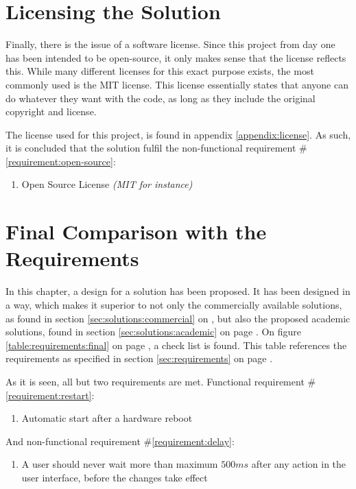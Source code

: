 	\section{Licensing the Solution}
		\label{requirement:fulfilled:open-source}
		Finally, there is the issue of a software license. Since this project from day one has been intended to be open-source, it only makes sense that the license reflects this. While many different licenses for this exact purpose exists, the most commonly used is the MIT license. This license essentially states that anyone can do whatever they want with the code, as long as they include the original copyright and license.

		The license used for this project, is found in appendix \ref{appendix:license}. As such, it is concluded that the solution fulfil the non-functional requirement \#\ref{requirement:open-source}:
		\vspace{-3ex}\begin{enumerate}
			\setlength\itemsep{0.1em}
			\setcounter{enumi}{2-1}
			\item Open Source License \emph{(MIT for instance)}
		\end{enumerate}


	\section{Final Comparison with the Requirements}
		In this chapter, a design for a solution has been proposed. It has been designed in a way, which makes it superior to not only the commercially available solutions, as found in section \ref{sec:solutions:commercial} on \pageref{sec:solutions:commercial}, but also the proposed academic solutions, found in section \ref{sec:solutions:academic} on page \pageref{sec:solutions:academic}. On figure \ref{table:requirements:final} on page \pageref{table:requirements:final}, a check list is found. This table references the requirements as specified in section \ref{sec:requirements} on page \pageref{sec:requirements}.

		As it is seen, all but two requirements are met. Functional requirement \#\ref{requirement:restart}:
		\vspace{-3ex}\begin{enumerate}
			\setlength\itemsep{0.1em}
			\setcounter{enumi}{17-1}
			\item Automatic start after a hardware reboot
		\end{enumerate}
		And non-functional requirement \#\ref{requirement:delay}:
		\vspace{-3ex}\begin{enumerate}
			\setlength\itemsep{0.1em}
			\setcounter{enumi}{7-1}
			\item A user should never wait more than maximum $500ms$ after any action in the user interface, before the changes take effect 
		\end{enumerate}

